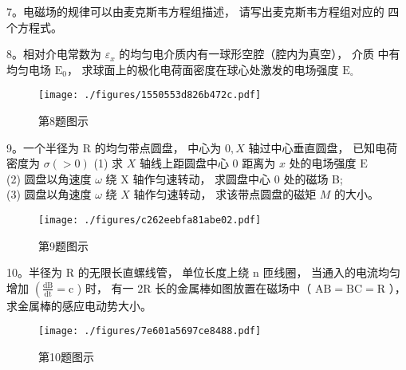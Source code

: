 7。电磁场的规律可以由麦克斯韦方程组描述， 请写出麦克斯韦方程组对应的 四个方程式。

8。相对介电常数为 $\varepsilon_{x}$ 的均匀电介质内有一球形空腔（腔内为真空）， 介质 中有均匀电场 $\mathrm{E}_{0}$， 求球面上的极化电荷面密度在球心处激发的电场强度 $\mathrm{E}_{\circ}$
\begin{figure}[ht]
\centering
\texttt{[image: ./figures/1550553d826b472c.pdf]}
\caption{第8题图示} \label{fig_BNU12_3}
\end{figure}

9。一个半径为 $\mathrm{R}$ 的均匀带点圆盘， 中心为 $0, X$ 轴过中心垂直圆盘， 已知电荷 密度为 $\sigma(>0)$
(1) 求 $X$ 轴线上距圆盘中心 0 距离为 $x$ 处的电场强度 $\mathrm{E} $\\
(2) 圆盘以角速度 $\omega$ 绕 $\mathrm{X}$ 轴作匀速转动， 求圆盘中心 0 处的磁场 B;\\
(3) 圆盘以角速度 $\omega$ 绕 $X$ 轴作匀速转动， 求该带点圆盘的磁矩 $M$ 的大小。
\begin{figure}[ht]
\centering
\texttt{[image: ./figures/c262eebfa81abe02.pdf]}
\caption{第9题图示} \label{fig_BNU12_4}
\end{figure}

10。半径为 $\mathrm{R}$ 的无限长直螺线管， 单位长度上绕 $\mathrm{n}$ 匝线圈， 当通入的电流均匀
增加 $\left(\frac{\mathrm{dB}}{\mathrm{dt}}=\mathrm{c}\right.$ ) 时， 有一 $2 \mathrm{R}$ 长的金属棒如图放置在磁场中（ $\mathrm{AB}=\mathrm{BC}=\mathrm{R}$ ）， 求金属棒的感应电动势大小。
\begin{figure}[ht]
\centering
\texttt{[image: ./figures/7e601a5697ce8488.pdf]}
\caption{第10题图示} \label{fig_BNU12_5}
\end{figure}